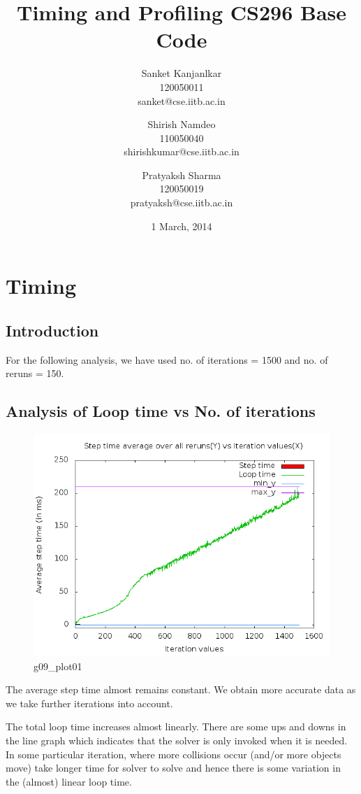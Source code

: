 \documentclass[11pt,english]{article}
\author{
                Sanket Kanjanlkar\\
                120050011\\
                sanket@cse.iitb.ac.in
                \and 
                Shirish Namdeo\\
                110050040\\
                shirishkumar@cse.iitb.ac.in
                \and
                Pratyaksh Sharma\\
                120050019\\
                pratyaksh@cse.iitb.ac.in
}
\title{Timing and Profiling CS296 Base Code}
\date{1 March, 2014}
\begin{document}
\maketitle
\section{Timing}
\subsection{Introduction}
\indent 
\par{For the following analysis, we have used no. of iterations = 1500 and no. of reruns = 150.}
\subsection{Analysis of Loop time vs No. of iterations}
\begin{figure}[h!]
\centering
\includegraphics[scale=.45]{g09_plot01.png}
\caption{g09\_plot01}
\end{figure}
\indent 
\par{The average step time almost remains constant. We obtain more accurate data as we take further iterations into account.} 
\indent 
\par{The total loop time increases almost linearly. There are some ups and downs in the line graph which indicates that the solver is only invoked when it is needed. In some particular iteration, where more collisions occur (and/or more objects move) take longer time for solver to solve and hence there is some variation in the (almost) linear loop time.}
\end{document}
